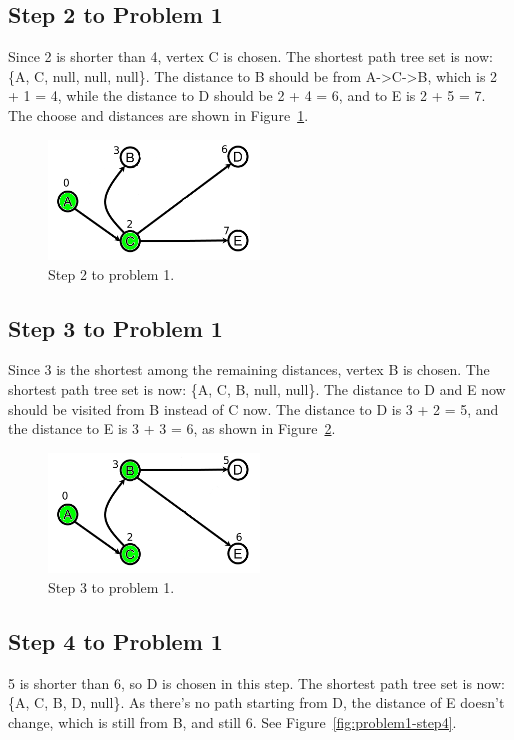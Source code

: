 \documentclass[doc,natbib,12pt]{article}
\begin{document}
	\subsection*{Step 2 to Problem 1}
	Since 2 is shorter than 4, vertex C is chosen. The shortest path tree set is now: \{A, C, null, null, null\}. The distance to B should be from A->C->B, which is 2 + 1 = 4, while the distance to D should be 2 + 4 = 6, and to E is 2 + 5 = 7. The choose and distances are shown in Figure~\ref{fig:problem1-step2}.
	
	\begin{figure}[htpb]
		\centering
		\includegraphics[width=0.5\textwidth]{1-2.png}
		\caption{\label{fig:problem1-step2}Step 2 to problem 1.}
	\end{figure}
	
	\subsection*{Step 3 to Problem 1}
	Since 3 is the shortest among the remaining distances, vertex B is chosen. The shortest path tree set is now: \{A, C, B, null, null\}. The distance to D and E now should be visited from B instead of C now. The distance to D is 3 + 2 = 5, and the distance to E is 3 + 3 = 6, as shown in Figure~\ref{fig:problem1-step3}.
	
	\begin{figure}[htpb]
		\centering
		\includegraphics[width=0.5\textwidth]{1-3.png}
		\caption{\label{fig:problem1-step3}Step 3 to problem 1.}
	\end{figure}
	
	\subsection*{Step 4 to Problem 1}
	5 is shorter than 6, so D is chosen in this step. The shortest path tree set is now: \{A, C, B, D, null\}. As there's no path starting from D, the distance of E doesn't change, which is still from B, and still 6. See Figure~\ref{fig:problem1-step4}.
	
\end{document}
